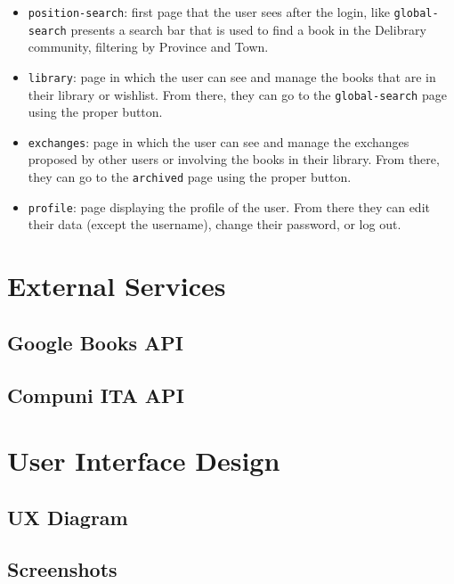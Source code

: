 \begin{itemize}
    \item \texttt{position-search}:
        first page that the user sees after the login, like \texttt{global-search} presents a search bar that is used to find a book
        in the Delibrary community, filtering by Province and Town.
    \item \texttt{library}:
        page in which the user can see and manage the books that are in their library or wishlist.
        From there, they can go to the \texttt{global-search} page using the proper button.
    \item \texttt{exchanges}:
        page in which the user can see and manage the exchanges proposed by other users or involving the books in their library.
        From there, they can go to the \texttt{archived} page using the proper button.
    \item \texttt{profile}:
        page displaying the profile of the user. From there they can edit their data (except the username), change their password, or log out.
\end{itemize}

\chapter{External Services}

\section{Google Books API}

\section{Compuni ITA API}



\chapter{User Interface Design}

\section{UX Diagram}

\section{Screenshots}



